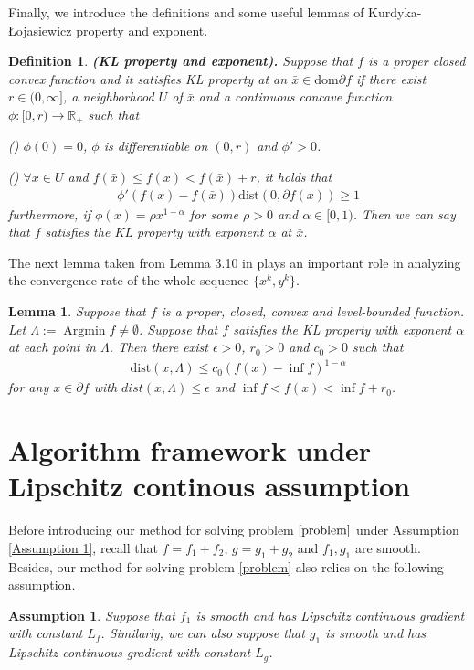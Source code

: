 \documentclass{article}
\numberwithin{equation}{section}
\newtheorem{lemma}{Lemma}[section]
\newtheorem{assumption}{Assumption}[section]
\newtheorem{definition}{Definition}[section]
\def\Argmin{\mathop{\mathrm{Argmin}}}
\begin{document}
Finally, we introduce the definitions and some useful lemmas of Kurdyka-\L{}ojasiewicz property and exponent.
\begin{definition}
    {\rm{\textbf{(KL property and exponent).}}} Suppose that $f$ is a proper closed convex function and it satisfies KL property 
    at an $\bar{x}\in \mathrm{dom} \partial f$ if there exist $r\in (0,\infty]$, a neighborhood $U$ of $\bar{x}$
    and a continuous concave function $\phi: [0,r) \rightarrow \mathbb{R}_+$ such that

    {\rm{()}} $\phi(0) = 0$, $\phi$ is differentiable on $(0,r)$ and $\phi' >0$.

    {\rm{()}} $\forall x\in U$ and $f(\bar{x}) \leq f(x) < f(\bar{x}) +r$, it holds that
                            \begin{align}
                                \phi'(f(x)-f(\bar{x}))\mathrm{dist}(0,\partial f(x)) \geq 1 \nonumber
                            \end{align}
    furthermore, if $\phi(x) = \rho x^{1-\alpha}$ for some $\rho>0$ and $\alpha\in[0,1)$. Then we can 
    say that $f$ satisfies the KL property with exponent $\alpha$ at $\bar{x}$. 
\end{definition}

The next lemma taken from Lemma 3.10 in \cite{bolte2014proximal} plays an important role in analyzing the convergence rate of the whole sequence
$\{x^k,y^k\}$. 
\begin{lemma} \label{error_bound}
    Suppose that $f$ is a proper, closed, convex and level-bounded function. 
    Let $\Lambda := \Argmin f \neq \emptyset$. Suppose that $f$ satisfies the KL property with exponent $\alpha$ 
    at each point in $\Lambda$. Then there exist $\epsilon>0$, $r_0>0$ and $c_0>0$ such that
    \begin{align}
        \mathrm{dist}(x,\Lambda) \leq c_0 (f(x)-\inf f)^{1-\alpha} \nonumber
    \end{align}
    for any $x\in \partial f$ with $dist(x,\Lambda) \leq \epsilon$ and $\inf f <f(x) < \inf f+ r_0$.
\end{lemma}

\section{Algorithm framework under Lipschitz continous assumption}\label{section_convergence_Lipschitz} 
Before introducing our method for solving problem $\eqref{problem}$ under Assumption \ref{Assumption 1}, recall that $f=f_1 + f_2$, 
$g=g_1+g_2$ and  $f_1,g_1$ are smooth. 
Besides, our method for solving problem \eqref{problem} also relies on the following assumption. 
\begin{assumption} \label{Assumption_Lipschitz_continuity}
    Suppose that $f_1$ is smooth and has Lipschitz continuous gradient with constant $L_f$. Similarly, 
    we can also suppose that $g_1$ is smooth and has Lipschitz continuous gradient with constant $L_g$.
\end{assumption}
\end{document}
